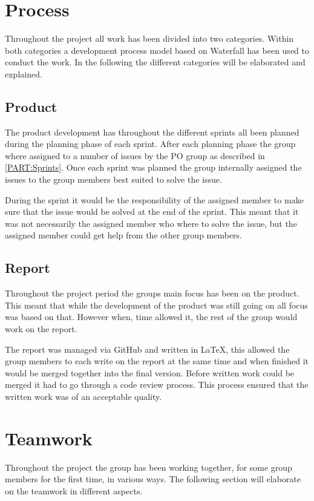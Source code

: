 \section{Process}
Throughout the project all work has been divided into two categories. 
Within both categories a development process model based on Waterfall has been used to conduct the work. 
In the following the different categories will be elaborated and explained.

\subsection{Product}
The product development has throughout the different sprints all been planned during the planning phase of each sprint. 
After each planning phase the group where assigned to a number of issues by the PO group as described in \autoref{PART:Sprints}.
Once each sprint was planned the group internally assigned the issues to the group members best suited to solve the issue.

During the sprint it would be the responsibility of the assigned member to make sure that the issue would be solved at the end of the sprint. 
This meant that it was not necessarily the assigned member who where to solve the issue, but the assigned member could get help from the other group members.

\subsection{Report}
Throughout the project period the groups main focus has been on the product. 
This meant that while the development of the product was still going on all focus was based on that.
However when, time allowed it, the rest of the group would work on the report. 

The report was managed via GitHub and written in \LaTeX, this allowed the group members to each write on the report at the same time and when finished it would be merged together into the final version. 
Before written work could be merged it had to go through a code review process. 
This process ensured that the written work was of an acceptable quality. 

\section{Teamwork}
Throughout the project the group has been working together, for some group members for the first time, in various ways. 
The following section will elaborate on the teamwork in different aspects. 

